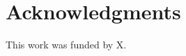 \documentclass{sigchi}
\begin{document}
\section{Acknowledgments}

This work was funded by X.

%
%
%
%
%




\end{document}
